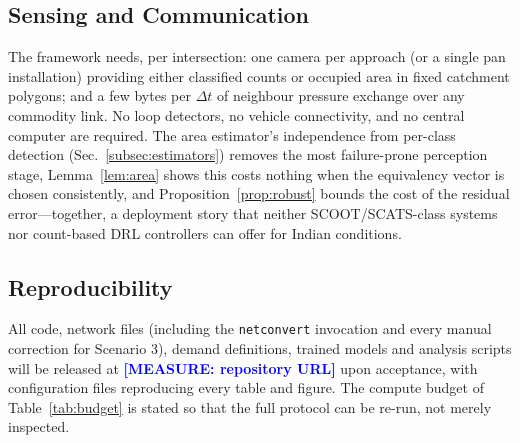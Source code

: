 \documentclass[journal]{IEEEtran}
\newcommand{\note}[1]{\textcolor{blue}{\textbf{[MEASURE: #1]}}}
\begin{document}
\subsection{Sensing and Communication}
The framework needs, per intersection: one camera per approach (or a
single pan installation) providing either classified counts or occupied
area in fixed catchment polygons; and a few bytes per $\Delta t$ of
neighbour pressure exchange over any commodity link. No loop detectors,
no vehicle connectivity, and no central computer are required. The area
estimator's independence from per-class detection
(Sec.~\ref{subsec:estimators}) removes the most failure-prone perception
stage, Lemma~\ref{lem:area} shows this costs nothing when the equivalency
vector is chosen consistently, and Proposition~\ref{prop:robust} bounds
the cost of the residual error---together, a deployment story that
neither SCOOT/SCATS-class systems nor count-based DRL controllers can
offer for Indian conditions.

\subsection{Reproducibility}
All code, network files (including the \texttt{netconvert} invocation and
every manual correction for Scenario 3), demand definitions, trained
models and analysis scripts will be released at
\note{repository URL} upon acceptance, with configuration files
reproducing every table and figure. The compute budget of
Table~\ref{tab:budget} is stated so that the full protocol can be
re-run, not merely inspected.

\end{document}
